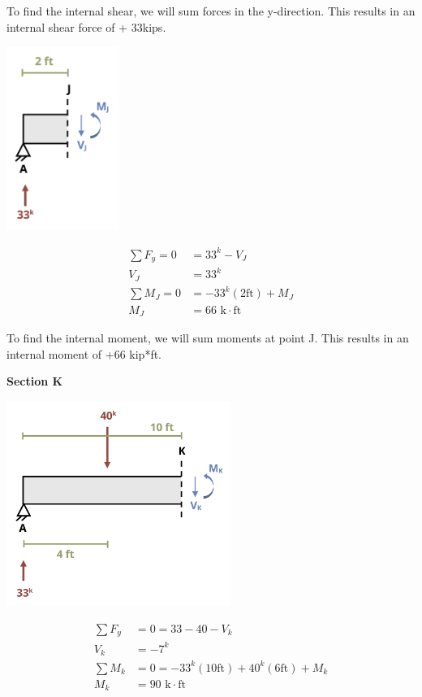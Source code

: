 \documentclass[
  letterpaper,
  DIV=11,
  numbers=noendperiod]{scrreprt}
\begin{document}
\begin{tcolorbox}
To find the internal shear, we will sum forces in the y-direction. This
results in an internal shear force of + 33kips.

\begin{center}
\includegraphics[width=1.44792in,height=\textheight]{images/CH7 PNGs/example 7.1 part 3.png}
\end{center}

\[
\begin{aligned}
\sum F_y=0 & =33^k-V_J \\
V_J & =33^k \\
\sum  M_J=0 & =-33^k(2\mathrm{ft})+M_J \\
M_J & =66 \text{ k} \cdot \mathrm{ft}
\end{aligned}
\]

To find the internal moment, we will sum moments at point J. This
results in an internal moment of +66 kip*ft.

\textbf{Section K}

\begin{center}
\includegraphics[width=2.88542in,height=\textheight]{images/CH7 PNGs/example 7.1 part 4.png}
\end{center}

\[
\begin{aligned}
\sum F_y & =0=33-40-V_k \\
V_k & =-7^k \\
\sum M_k & =0=-33^k(10 \mathrm{ft})+40^k(6 \mathrm{ft})+M_k \\
M_k & =90 \text{ k} \cdot \mathrm{ft}
\end{aligned}
\]


\end{tcolorbox}
\end{document}
